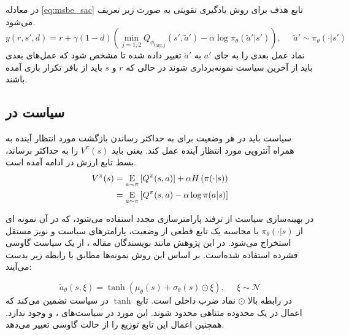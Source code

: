        
       در معادله 
       \eqref{eq:msbe_sac}
       تابع هدف برای روش یادگیری تقویتی 
       به صورت زیر تعریف می‌شود.
       \begin{equation}
       	y(r, s', d) = r + \gamma (1 - d) \left( \min_{j=1,2} Q_{\phi_{\text{targ},j}}(s', \tilde{a}') - \alpha \log \pi_{\theta}(\tilde{a}'|s') \right), \;\;\;\;\; \tilde{a}' \sim \pi_{\theta}(\cdot|s')
       \end{equation}
       نماد عمل بعدی را به جای 
       \(a'\)
        به
        \( \tilde{a}'\)
         تغییر داده شده تا مشخص شود که عمل‌های بعدی باید از آخرین سیاست نمونه‌برداری شوند در حالی که 
          \(r\)
           و 
           \(s\)
            باید از بافر تکرار بازی آمده باشند.
            
            
          \subsection{سیاست در }
          سیاست باید در هر وضعیت برای به حداکثر رساندن بازگشت مورد انتظار آینده به همراه آنتروپی مورد انتظار آینده عمل کند. یعنی باید
           \(V^{\pi}(s)\)
            را به حداکثر برساند، بسط تابع ارزش در ادامه آمده است.
          \begin{align}
          	V^{\pi}(s) &= \underset{a \sim \pi}{\mathrm{E}}\left[
          	{Q^{\pi}(s,a)}
          	\right] + \alpha H\left(\pi(\cdot|s)\right) \\
          	&= \underset{a \sim \pi}{\mathrm{E}}\left[
          	{Q^{\pi}(s,a) - \alpha \log \pi(a|s)}
          	\right]
          \end{align}
          
          در بهینه‌سازی سیاست از ترفند پارامترسازی مجدد
           استفاده می‌شود، که در آن نمونه ای از 
           \(\pi_{\theta}(\cdot|s)\)
            با محاسبه یک تابع قطعی از وضعیت، پارامترهای سیاست و نویز مستقل استخراج می‌شود. در این پژوهش مانند نویسندگان مقاله 
            \cite{DBLP:journals/corr/abs-1801-01290}،
             از یک سیاست گاوسی
              فشرده استفاده شده‌است. بر اساس این روش نمونه‌ها مطابق با رابطه زیر بدست می‌آیند:
              
              \begin{equation}
              	\tilde{a}_{\theta}(s, \xi) = \tanh\left( \mu_{\theta}(s) + \sigma_{\theta}(s) \odot \xi \right), \;\;\;\;\; \xi \sim \mathcal{N}
              \end{equation}
              در رابطه بالا \(\odot\) نماد ضرب داخلی است.
              تابع 
              \(\tanh\)
               در سیاست  تضمین می‌کند که اعمال در یک محدوده متناهی محدود شوند. این مورد در سیاست‌های ،  و  وجود ندارد. همچنین اعمال این تابع توزیع را از حالت گاوسی تغییر می‌دهد.
               
